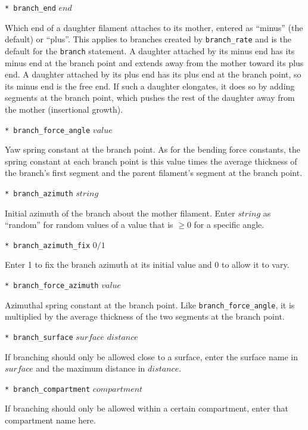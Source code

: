 \documentclass {scrbook}
\newcommand {\ttt} {\texttt}
\begin{document}
\begin{description}
\item{\ttt{* branch\_end} $end$} %

Which end of a daughter filament attaches to its mother, entered as ``minus'' (the default) or ``plus''. This applies to branches created by \ttt{branch\_rate} and is the default for the \ttt{branch} statement. A daughter attached by its minus end has its minus end at the branch point and extends away from the mother toward its plus end. A daughter attached by its plus end has its plus end at the branch point, so its minus end is the free end. If such a daughter elongates, it does so by adding segments at the branch point, which pushes the rest of the daughter away from the mother (insertional growth).

\item{\ttt{* branch\_force\_angle} $value$}%

Yaw spring constant at the branch point. As for the bending force constants, the spring constant at each branch point is this value times the average thickness of the branch's first segment and the parent filament's segment at the branch point.

\item{\ttt{* branch\_azimuth} $string$}%

Initial azimuth of the branch about the mother filament. Enter $string$ as ``random'' for random values of a value that is $\geq 0$ for a specific angle.

\item{\ttt{* branch\_azimuth\_fix} $0/1$}%

Enter 1 to fix the branch azimuth at its initial value and 0 to allow it to vary.

\item{\ttt{* branch\_force\_azimuth} $value$}%

Azimuthal spring constant at the branch point. Like \ttt{branch\_force\_angle}, it is multiplied by the average thickness of the two segments at the branch point.

\item{\ttt{* branch\_surface} $surface$ $distance$}%

If branching should only be allowed close to a surface, enter the surface name in $surface$ and the maximum distance in $distance$.

\item{\ttt{* branch\_compartment} $compartment$}%

If branching should only be allowed within a certain compartment, enter that compartment name here.


\end{description}
\end{document}
